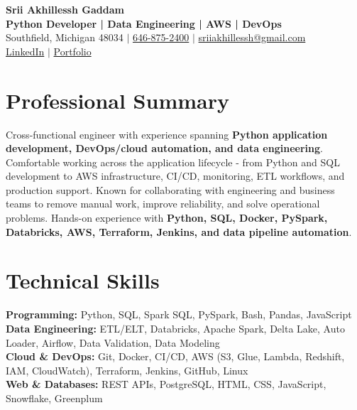 \documentclass[letterpaper,10pt]{article}
\begin{document}
\fontsize{9.35pt}{10.45pt}\selectfont

\begin{center}
    {\LARGE \textbf{Srii Akhillessh Gaddam}} \\[-1pt]
    \textbf{Python Developer | Data Engineering | AWS | DevOps} \\[2pt]
    Southfield, Michigan 48034 $|$
    \href{tel:6468752400}{646-875-2400} $|$
    \href{mailto:sriiakhillessh@gmail.com}{sriiakhillessh@gmail.com} \\[1pt]
    \href{https://www.linkedin.com/in/srii-akhiilessh-gaddam-b48668191/}{LinkedIn} $|$
    \href{https://sriiakhillesshg.github.io/portfolio/}{Portfolio}
\end{center}
\vspace{-8pt}

\section{Professional Summary}
\small{Cross-functional engineer with experience spanning \textbf{Python application development, DevOps/cloud automation, and data engineering}. Comfortable working across the application lifecycle - from Python and SQL development to AWS infrastructure, CI/CD, monitoring, ETL workflows, and production support. Known for collaborating with engineering and business teams to remove manual work, improve reliability, and solve operational problems. Hands-on experience with \textbf{Python, SQL, Docker, PySpark, Databricks, AWS, Terraform, Jenkins, and data pipeline automation}.}

\section{Technical Skills}
\small{
\textbf{Programming:} Python, SQL, Spark SQL, PySpark, Bash, Pandas, JavaScript \\
\textbf{Data Engineering:} ETL/ELT, Databricks, Apache Spark, Delta Lake, Auto Loader, Airflow, Data Validation, Data Modeling \\
\textbf{Cloud \& DevOps:} Git, Docker, CI/CD, AWS (S3, Glue, Lambda, Redshift, IAM, CloudWatch), Terraform, Jenkins, GitHub, Linux \\
\textbf{Web \& Databases:} REST APIs, PostgreSQL, HTML, CSS, JavaScript, Snowflake, Greenplum
}
\end{document}
